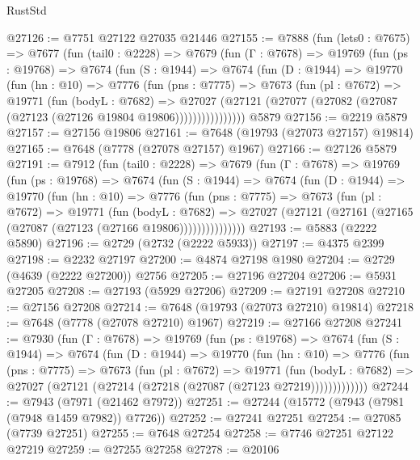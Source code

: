 \begin{lexlean}{RustStd}
\begin{coremodule}
{\begin{coremodule}
{{{{{{{{{{{{{{{{{{{{{{{{{{{{{{{{{{{{{{{{{{{{{{{{{{{{{@27126 := @7751 @27122 @27035 @21446
@27155 := @7888
    (fun (lets0 : @7675) =>
    @7677
      (fun (tail0 : @2228) =>
      @7679
        (fun (Γ : @7678) =>
        @19769
          (fun (ps : @19768) =>
          @7674
            (fun (S : @1944) =>
            @7674
              (fun (D : @1944) =>
              @19770
                (fun (hn : @10) =>
                @7776
                  (fun (pns : @7775) =>
                  @7673
                    (fun (pl : @7672) =>
                    @19771
                      (fun (bodyL : @7682) =>
                      @27027
                        (@27121
                          (@27077 (@27082 (@27087 (@27123 (@27126 @19804 @19806))))))))))))))))
    @5879
@27156 := @2219 @5879
@27157 := @27156 @19806
@27161 := @7648 (@19793 (@27073 @27157) @19814)
@27165 := @7648 (@7778 (@27078 @27157) @1967)
@27166 := @27126 @5879
@27191 := @7912
    (fun (tail0 : @2228) =>
    @7679
      (fun (Γ : @7678) =>
      @19769
        (fun (ps : @19768) =>
        @7674
          (fun (S : @1944) =>
          @7674
            (fun (D : @1944) =>
            @19770
              (fun (hn : @10) =>
              @7776
                (fun (pns : @7775) =>
                @7673
                  (fun (pl : @7672) =>
                  @19771
                    (fun (bodyL : @7682) =>
                    @27027 (@27121 (@27161 (@27165 (@27087 (@27123 (@27166 @19806)))))))))))))))
@27193 := @5883 (@2222 @5890)
@27196 := @2729 (@2732 (@2222 @5933))
@27197 := @4375 @2399
@27198 := @2232 @27197
@27200 := @4874 @27198 @1980
@27204 := @2729 (@4639 (@2222 @27200)) @2756
@27205 := @27196 @27204
@27206 := @5931 @27205
@27208 := @27193 (@5929 @27206)
@27209 := @27191 @27208
@27210 := @27156 @27208
@27214 := @7648 (@19793 (@27073 @27210) @19814)
@27218 := @7648 (@7778 (@27078 @27210) @1967)
@27219 := @27166 @27208
@27241 := @7930
    (fun (Γ : @7678) =>
    @19769
      (fun (ps : @19768) =>
      @7674
        (fun (S : @1944) =>
        @7674
          (fun (D : @1944) =>
          @19770
            (fun (hn : @10) =>
            @7776
              (fun (pns : @7775) =>
              @7673
                (fun (pl : @7672) =>
                @19771
                  (fun (bodyL : @7682) =>
                  @27027 (@27121 (@27214 (@27218 (@27087 (@27123 @27219)))))))))))))
@27244 := @7943 (@7971 (@21462 @7972))
@27251 := @27244 (@15772 (@7943 (@7981 (@7948 @1459 @7982)) @7726))
@27252 := @27241 @27251
@27254 := @27085 (@7739 @27251)
@27255 := @7648 @27254
@27258 := @7746 @27251 @27122 @27219
@27259 := @27255 @27258
@27278 := @20106
}}}}}}}}}}}}}}}}}}}}}}}}}}}}}}}}}}}}}}}}}}}}}}}}}}}}}
\end{coremodule}}
\end{coremodule}
\end{lexlean}
